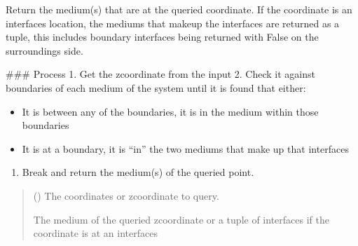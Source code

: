 \documentclass[letterpaper,10pt,english]{sphinxmanual}
\begin{document}
\begin{fulllineitems}

\begin{fulllineitems}
\label{\detokenize{generated/photon_canon.optics:photon_canon.optics.System.in_medium}}
\pysigstartsignatures
\pysiglinewithargsret
{}
{}
{}
\pysigstopsignatures
\sphinxAtStartPar
Return the medium(s) that are at the queried coordinate. If the coordinate is an interfaces location, the
mediums that makeup the interfaces are returned as a tuple, this includes boundary interfaces being returned
with False on the surroundings side.

\sphinxAtStartPar
\#\#\# Process
1. Get the z\sphinxhyphen{}coordinate from the input
2. Check it against boundaries of each medium of the system until it is found that either:
\begin{itemize}
\item {} 
\sphinxAtStartPar
It is between any of the boundaries, it is in the medium within those boundaries

\item {} 
\sphinxAtStartPar
It is at a boundary, it is “in” the two mediums that make up that interfaces

\end{itemize}
\begin{enumerate}
%
\setcounter{enumi}{2}
\item {} 
\sphinxAtStartPar
Break and return the medium(s) of the queried point.

\end{enumerate}
\begin{quote}\begin{description}
\sphinxAtStartPar
{} (\sphinxstyleliteralemphasis{\sphinxupquote{, }}\sphinxstyleliteralemphasis{\sphinxupquote{, }}\sphinxstyleliteralemphasis{\sphinxupquote{, }}) \textendash{} The coordinates or z\sphinxhyphen{}coordinate to query.

\sphinxAtStartPar
The medium of the queried z\sphinxhyphen{}coordinate or a tuple of interfaces if the coordinate is at an interfaces


\end{description}
\end{quote}
\end{fulllineitems}
\end{fulllineitems}
\end{document}
